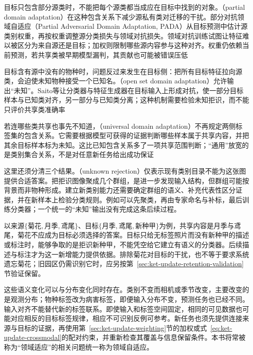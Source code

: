 目标只包含部分源类时，不能把每个源类都当成应在目标中找到的对象。（partial domain adaptation）在这种包含关系下减少源私有类对迁移的干扰。部分对抗领域自适应（Partial Adversarial Domain Adaptation, PADA）从目标预测中估计源类别权重，再按权重调整源分类损失与领域对抗损失。领域对抗训练试图让特征难以被区分为来自源还是目标；加权则限制哪些源内容参与这种对齐。权重仍依赖当前预测，若共享类被早期模型漏判，其贡献也可能被错误压低

目标含有源中没有的物种时，问题反过来发生在目标侧：把所有目标特征拉向源类，会迫使未知物种接受一个已知名。（open set domain adaptation）允许输出“未知”。Saito等让分类器与特征生成器在目标输入上形成对抗，使一部分目标样本与已知类对齐，另一部分与已知类分离；这种机制需要检验未知拒识，而不能只评价共享类准确率

若连哪些类共享也事先不知道，（universal domain adaptation）不再规定两侧标签集的包含关系。它需要根据模型可获得的证据判断哪些样本属于共享内容，并把其余目标样本标为未知。这比已知包含关系多了一项共享范围判断；“通用”放宽的是类别集合关系，不是对任意新任务给出成功保证

这里还须分清三个结果。（unknown rejection）仅表示现有类别目录不能为这张图提供合适答案。把拒识图像聚成几个群组，是进一步发现输入结构，但群组可能按背景而非物种形成。建立新类别能力还需要确定群组的语义、补充代表性区分证据，并在新样本上检验分类规则。例如可以先聚类，再由专家命名与补标，最后训练分类器；一个统一的“未知”输出没有完成这条后续过程。

以来源$\{\text{菊花},\text{月季},\text{鸢尾}\}$、目标$\{\text{月季},\text{鸢尾},\text{新种甲}\}$为例，共享内容是月季与鸢尾，菊花不应成为目标必须选择的答案。目标只给无标签照片而没有新种甲的描述或标注时，能够争取的是拒识新种甲，不能凭空给它建立有语义的分类器。后续描述与标注才为这一新增能力提供依据。排除菊花对目标的干扰，也不等于要求系统遗忘菊花；旧园区仍需识别它时，应另按第~\ref{sec:ket-update-retention-validation}节验证保留。

这些语义变化可以与分布变化同时存在。类别不变而相机或季节改变，主要改变的是观测分布；物种标签改为病害标签，即便输入分布不变，预测任务也已经不同。输入对齐不能替代新的标签联系。即使输入和标签空间固定，相同的可见数据也可能对应相反的目标标签规律，相应不可识别反例可参考。新任务也须先提供连接来源与目标的证据，再使用第~\ref{sec:ket-update-weighting}节的加权或式~\eqref{eq:ket-update-crossmodal}的配对约束，并重新检查其覆盖与信息保留条件。本书将常被称为“领域适应”的相关问题统一称为领域自适应。

